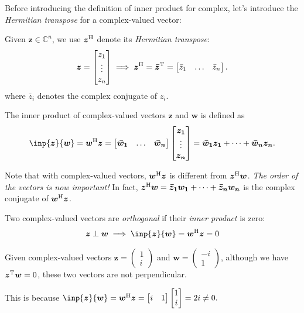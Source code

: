 Before introducing the definition of inner product for complex, let's introduce the \emph{Hermitian transpose} for a complex-valued vector:
\begin{definition}
Given $\bm z\in\mathbb{C}^n$, we use $\bm z^{\mathrm H}$ denote its \emph{Hermitian transpose}:
\[
\bm z=\begin{bmatrix}
z_1\\\vdots\\z_n
\end{bmatrix}\implies
\bm z^{\mathrm H}=\bm{\bar z}^{\mathrm T}=\begin{bmatrix}
\bar z_1&\dots&\bar z_n
\end{bmatrix}.
\]
where $\bar z_i$ denotes the complex conjugate of $z_i$.
\end{definition}
\begin{definition}
The inner product of complex-valued vectors $\bm z$ and $\bm w$ is defined as
\[
\inp{\bm z}{\bm w}=\bm w\Her\bm z=\begin{bmatrix}
\bm{\bar w_1}&\dots&\bm{\bar w_n}
\end{bmatrix}\begin{bmatrix}
\bm{z_1}\\\vdots\\\bm{z_n}
\end{bmatrix}=\bm{\bar w_1}\bm{z_1}+\dots+\bm{\bar w_n}\bm{z_n}.
\]
\end{definition}
\begin{remark}
Note that with complex-valued vectors, $\bm w^{\mathrm H}\bm z$ is different from $\bm z^{\mathrm H}\bm w$. \emph{The order of the vectors is now important!} In fact, $\bm z^{\mathrm H}\bm w=\bm{\bar z_1}\bm{w_1}+\dots+\bm{\bar z_n}\bm{w_n}$ is the complex conjugate of $\bm w^{\mathrm H}\bm z$.
\end{remark}
\begin{definition}[Orthogonal]
Two complex-valued vectors are \textit{orthogonal} if their \emph{inner product} is zero:
\[
\bm z\perp\bm w\implies
\inp{\bm z}{\bm w}=\bm w\Her\bm z=0
\]
\end{definition}
\begin{example}
Given complex-valued vectors
$\bm z=\begin{pmatrix}
1\\i
\end{pmatrix}$ and $\bm w=\begin{pmatrix}
-i\\1
\end{pmatrix}$,
although we have $\bm z^{\mathrm T}\bm w=0$, these two vectors are not perpendicular.

This is because $\inp{\bm z}{\bm w}=\bm w\Her\bm z=\begin{bmatrix}
i&1
\end{bmatrix}\begin{bmatrix}
1\\i
\end{bmatrix}=2i\ne0.$
\end{example}
